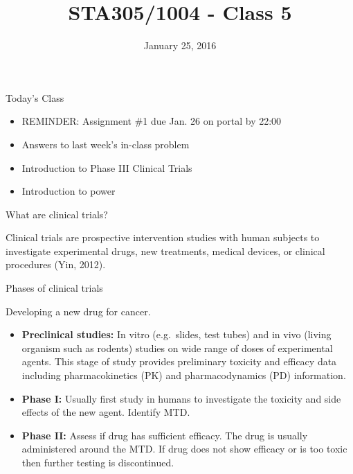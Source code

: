 \documentclass[ignorenonframetext,]{beamer}
\title{STA305/1004 - Class 5}
\date{January 25, 2016}
\begin{document}
\frame{\titlepage}

\begin{frame}{Today's Class}

\begin{itemize}[<+->]
\itemsep1pt\parskip0pt
\item
  REMINDER: Assignment \#1 due Jan. 26 on portal by 22:00
\item
  Answers to last week's in-class problem
\item
  Introduction to Phase III Clinical Trials
\item
  Introduction to power
\end{itemize}

\end{frame}

\begin{frame}{What are clinical trials?}

Clinical trials are prospective intervention studies with human subjects
to investigate experimental drugs, new treatments, medical devices, or
clinical procedures (Yin, 2012).

\end{frame}

\begin{frame}{Phases of clinical trials}

Developing a new drug for cancer.

\begin{itemize}[<+->]
\item
  \textbf{Preclinical studies:} In vitro (e.g.~slides, test tubes) and
  in vivo (living organism such as rodents) studies on wide range of
  doses of experimental agents. This stage of study provides preliminary
  toxicity and efficacy data including pharmacokinetics (PK) and
  pharmacodynamics (PD) information.
\item
  \textbf{Phase I:} Usually first study in humans to investigate the
  toxicity and side effects of the new agent. Identify MTD.
\item
  \textbf{Phase II:} Assess if drug has sufficient efficacy. The drug is
  usually administered around the MTD. If drug does not show efficacy or
  is too toxic then further testing is discontinued.
\end{itemize}

\end{frame}
\end{document}
